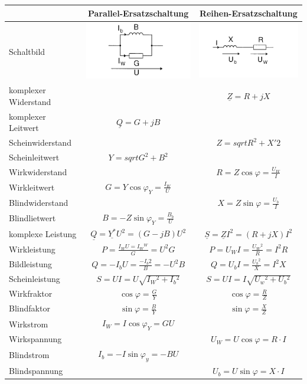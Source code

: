 	\begin{centering}
	\begin{tabular}{|l|c|c|}
		\hline
			& Parallel-Ersatzschaltung & Reihen-Ersatzschaltung \\
		\hline
			Schaltbild & \includegraphics[width=5.5cm]{./bilder/RL_parallel.png} &
			\includegraphics[width=5.5cm]{./bilder/RL_Seriel.png}\\
		\hline
			komplexer Widerstand & & $\underline{Z}=R+jX$\\
			komplexer Leitwert & $\underline{Q}=G+jB$ &\\
		\hline
			Scheinwiderstand & & $Z=sqrt{R^2+X'2}$\\
			Scheinleitwert & $Y=sqrt{G^2+B^2}$ & \\
		\hline
			Wirkwiderstand & & $R=Z\cos\varphi=\frac{U_W}{I}$\\
			Wirkleitwert & $G=Y\cos\varphi_Y=\frac{I_W}{U}$&\\
		\hline
			Blindwiderstand & & $X=Z\sin\varphi=\frac{U_b}{I}$\\
			Blindlietwert & $B = -Z\sin\varphi_Y = \frac{B_b}{U}$&\\
		\hline
			komplexe Leistung & $\underline{Q}=
			\underline{Y^*}U^2=\left(G-jB\right)U^2$& $\underline{S}=\underline{Z}I^2=\left(R+jX\right)I^2$\\
			Wirkleistung & $P=\frac{I_WU=I{_W}{^W}}{G}=U^2G$ &
			$P=U_WI=\frac{U{_W}{^2}}{R}=I^2R$ \\
			Bildleistung & $Q=-I_bU=\frac{-I{_b}{2}}{B}=-U^2B$ & $Q = U_bI =
			\frac{U{_b}{^2}}{X}=I^2X$\\
			Scheinleistung & $S=UI=U\sqrt{I{_W}{^2}+I{_b}{^2}}$ & $S=UI =
			I\sqrt{U{_w}{^2}+U{_b}{^2}}$\\
		\hline
			Wirkfraktor & $\cos\varphi= \frac{G}{Y}$ & $\cos\varphi=\frac{R}{Z}$\\
			Blindfaktor & $\sin\varphi= \frac{B}{Y}$ & $\sin\varphi=\frac{X}{Z}$\\
		\hline
			Wirkstrom & $I_W=I\cos\varphi_Y=GU$ & \\
			Wirkspannung & & $U_W = U\cos\varphi =R \cdot I$ \\
		\hline
			Blindstrom & $I_b = -I \sin\varphi_y = -BU$ & \\
			Blindspannung & & $U_b=U\sin\varphi=X\cdot I$\\
		\hline
	\end{tabular}\\
	\end{centering}
